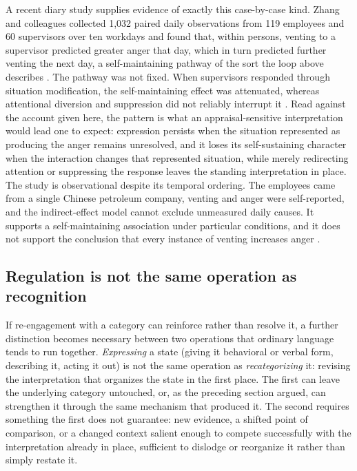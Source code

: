 \documentclass[11pt]{article}
\begin{document}
A recent diary study supplies evidence of exactly this case-by-case kind. Zhang and colleagues collected 1,032 paired daily observations from 119 employees and 60 supervisors over ten workdays and found that, within persons, venting to a supervisor predicted greater anger that day, which in turn predicted further venting the next day, a self-maintaining pathway of the sort the loop above describes \citep{Zhang2026}. The pathway was not fixed. When supervisors responded through situation modification, the self-maintaining effect was attenuated, whereas attentional diversion and suppression did not reliably interrupt it \citep{Zhang2026}. Read against the account given here, the pattern is what an appraisal-sensitive interpretation would lead one to expect: expression persists when the situation represented as producing the anger remains unresolved, and it loses its self-sustaining character when the interaction changes that represented situation, while merely redirecting attention or suppressing the response leaves the standing interpretation in place. The study is observational despite its temporal ordering. The employees came from a single Chinese petroleum company, venting and anger were self-reported, and the indirect-effect model cannot exclude unmeasured daily causes. It supports a self-maintaining association under particular conditions, and it does not support the conclusion that every instance of venting increases anger \citep{Zhang2026}.

\subsection{Regulation is not the same operation as recognition}\label{sub:expression}

If re-engagement with a category can reinforce rather than resolve it, a further distinction becomes necessary between two operations that ordinary language tends to run together. \emph{Expressing} a state (giving it behavioral or verbal form, describing it, acting it out) is not the same operation as \emph{recategorizing} it: revising the interpretation that organizes the state in the first place. The first can leave the underlying category untouched, or, as the preceding section argued, can strengthen it through the same mechanism that produced it. The second requires something the first does not guarantee: new evidence, a shifted point of comparison, or a changed context salient enough to compete successfully with the interpretation already in place, sufficient to dislodge or reorganize it rather than simply restate it.
\end{document}
